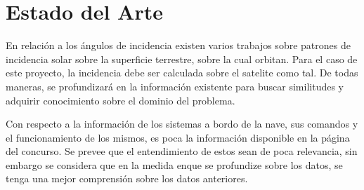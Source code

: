 \documentclass[../Main.tex]{subfiles}
\begin{document}
\section{Estado del Arte}
En relación a los ángulos de incidencia existen varios trabajos sobre patrones de incidencia solar sobre la superficie terrestre, sobre la cual orbitan. Para el caso de este proyecto, la incidencia debe ser calculada sobre el satelite como tal. De todas maneras, se profundizará en la información existente para buscar similitudes y adquirir conocimiento sobre el dominio del problema.
\newline \par
Con respecto a la información de los sistemas a bordo de la nave, sus comandos y el funcionamiento de los mismos, es poca la información disponible en la página del concurso. Se prevee que el entendimiento de estos sean de poca relevancia, sin embargo se considera que en la medida enque se profundize sobre los datos, se tenga una mejor comprensión sobre los datos anteriores. 
\end{document}

